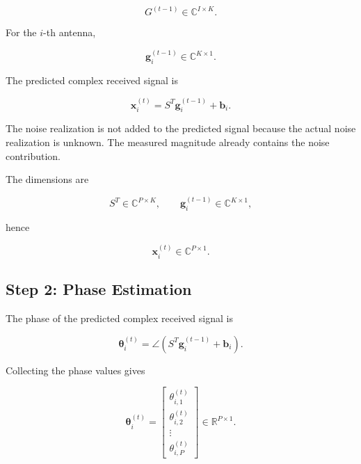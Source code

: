 \documentclass[12pt,a4paper]{article}
\begin{document}
\begin{equation}
G^{(t-1)}
\in
\mathbb C^{I\times K}.
\tag{295}
\end{equation}

For the $i$-th antenna,

\begin{equation}
\mathbf g_i^{(t-1)}
\in
\mathbb C^{K\times1}.
\tag{296}
\end{equation}

The predicted complex received signal is

\begin{equation}
\boxed{
\mathbf x_i^{(t)}
=
S^T\mathbf g_i^{(t-1)}
+
\mathbf b_i
}.
\tag{297}
\end{equation}

The noise realization is not added to the predicted signal because the actual noise realization is unknown. The measured magnitude already contains the noise contribution.

The dimensions are

\begin{equation}
S^T\in\mathbb C^{P\times K},
\qquad
\mathbf g_i^{(t-1)}
\in
\mathbb C^{K\times1},
\tag{298}
\end{equation}

hence

\begin{equation}
\mathbf x_i^{(t)}
\in
\mathbb C^{P\times1}.
\tag{299}
\end{equation}

\subsection{Step 2: Phase Estimation}

The phase of the predicted complex received signal is

\begin{equation}
\boxed{
\boldsymbol{\theta}_i^{(t)}
=
\angle
\left(
S^T\mathbf g_i^{(t-1)}
+
\mathbf b_i
\right)
}.
\tag{300}
\end{equation}

Collecting the phase values gives

\begin{equation}
\boldsymbol{\theta}_i^{(t)}
=
\begin{bmatrix}
\theta_{i,1}^{(t)}\\
\theta_{i,2}^{(t)}\\
\vdots\\
\theta_{i,P}^{(t)}
\end{bmatrix}
\in
\mathbb R^{P\times1}.
\tag{301}
\end{equation}
\end{document}
